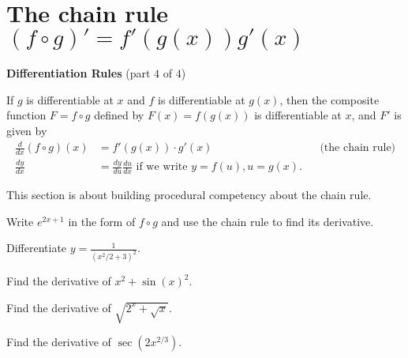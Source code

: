\documentclass[../main.tex]{subfiles}
\begin{document}
 \section{The chain rule\texorpdfstring{ \((f \circ g)' = f'(g(x))g'(x)\)}{}}
  \begin{mdframed}[style=simple]
    \textbf{Differentiation Rules} \hfill {\footnotesize (part \(4\) of \(4\))}

    If \(g\) is differentiable at \(x\) and \(f\) is differentiable at \(g(x)\), then the composite function \(F = f \circ g\) defined by \(F(x) = f(g(x))\) is differentiable at \(x\), and \(F'\) is given by 
    \begin{align*}
      \frac{d}{dx} (f \circ g)(x)
    &= f'(g(x)) \cdot g'(x)
    &&\text{(the chain rule)}\\[1em]
    \frac{dy}{dx} &= \frac{dy}{du} \frac{du}{dx} \text{ if we write } y = f(u), u = g(x).
    \end{align*}
  \end{mdframed}
  This section is about building procedural competency about the chain rule.

  \begin{example}
    Write \(e^{2x + 1}\) in the form of \(f \circ g\) and use the chain rule to find its derivative.

  \end{example}


  \begin{example}
    Differentiate \(y = \frac{1}{(x^{2}/2 + 3)^{2}}\).

  \end{example}
  \clearpage{}


  \begin{example}
    Find the derivative of \(x^{2} + \sin(x)^{2}\).

  \end{example}


  \begin{example}
    Find the derivative of \(\sqrt{2^{x} + \sqrt{x}}\).

  \end{example}


  \begin{example}
    Find the derivative of \(\sec(2x^{2/3})\).
    
  \end{example}
\end{document}
